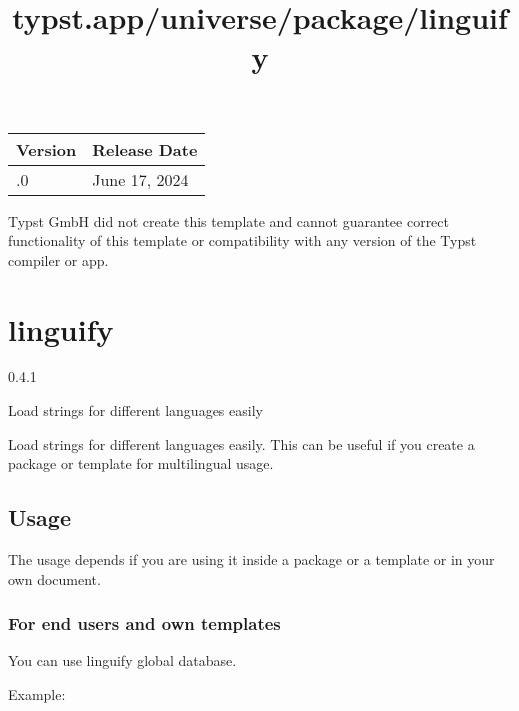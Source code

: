 \begin{longtable}[]{@{}ll@{}}
\toprule\noalign{}
Version & Release Date \\
\midrule\noalign{}
\endhead
\bottomrule\noalign{}
\endlastfoot
0.1.0 & June 17, 2024 \\
\end{longtable}

Typst GmbH did not create this template and cannot guarantee correct
functionality of this template or compatibility with any version of the
Typst compiler or app.


\title{typst.app/universe/package/linguify}

\label{banner}
\section{linguify}\label{linguify}

{ 0.4.1 }

Load strings for different languages easily

\label{readme}
Load strings for different languages easily. This can be useful if you
create a package or template for multilingual usage.

\subsection{Usage}\label{usage}

The usage depends if you are using it inside a package or a template or
in your own document.

\subsubsection{For end users and own
templates}\label{for-end-users-and-own-templates}

You can use linguify global database.

Example:

\begin{Shaded}
\begin{Highlighting}[]



\end{Highlighting}
\end{Shaded}

